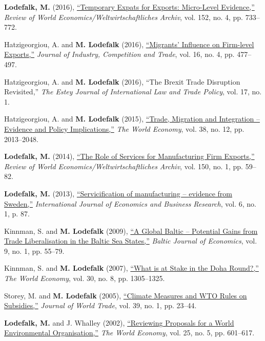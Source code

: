 \documentclass[11pt,a4paper]{article}
\newcommand{\name}[1]{\textbf{#1}}
\newcommand{\publication}[1]{\item #1}
\begin{document}
\begin{enumerate}[label={[\arabic*]}]
\publication{\name{Lodefalk, M.} (2016), \href{https://doi.org/10.1007/s10290-016-0254-0}{``Temporary Expats for Exports: Micro-Level Evidence,''} \textit{Review of World Economics/Weltwirtschaftliches Archiv}, vol. 152, no. 4, pp. 733--772.}

\publication{Hatzigeorgiou, A. and \name{M. Lodefalk} (2016), \href{https://doi.org/10.1007/s10842-015-0215-7}{``Migrants' Influence on Firm-level Exports,''} \textit{Journal of Industry, Competition and Trade}, vol. 16, no. 4, pp. 477--497.}

\publication{Hatzigeorgiou, A. and \name{M. Lodefalk} (2016), ``The Brexit Trade Disruption Revisited,'' \textit{The Estey Journal of International Law and Trade Policy}, vol. 17, no. 1.}

\publication{Hatzigeorgiou, A. and \name{M. Lodefalk} (2015), \href{https://doi.org/10.1111/twec.12236}{``Trade, Migration and Integration -- Evidence and Policy Implications,''} \textit{The World Economy}, vol. 38, no. 12, pp. 2013--2048.}

\publication{\name{Lodefalk, M.} (2014), \href{https://doi.org/10.1007/s10290-013-0171-4}{``The Role of Services for Manufacturing Firm Exports,''} \textit{Review of World Economics/Weltwirtschaftliches Archiv}, vol. 150, no. 1, pp. 59--82.}

\publication{\name{Lodefalk, M.} (2013), \href{https://doi.org/10.1504/ijebr.2013.054855}{``Servicification of manufacturing -- evidence from Sweden,''} \textit{International Journal of Economics and Business Research}, vol. 6, no. 1, p. 87.}

\publication{Kinnman, S. and \name{M. Lodefalk} (2009), \href{https://doi.org/10.1080/1406099x.2009.10840453}{``A Global Baltic -- Potential Gains from Trade Liberalisation in the Baltic Sea States,''} \textit{Baltic Journal of Economics}, vol. 9, no. 1, pp. 55--79.}

\publication{Kinnman, S. and \name{M. Lodefalk} (2007), \href{https://doi.org/10.1111/j.1467-9701.2007.01045.x}{``What is at Stake in the Doha Round?,''} \textit{The World Economy}, vol. 30, no. 8, pp. 1305--1325.}

\publication{Storey, M. and \name{M. Lodefalk} (2005), \href{https://doi.org/10.54648/trad2005005}{``Climate Measures and WTO Rules on Subsidies,''} \textit{Journal of World Trade}, vol. 39, no. 1, pp. 23--44.}

\publication{\name{Lodefalk, M.} and J. Whalley (2002), \href{https://doi.org/10.1111/1467-9701.00452}{``Reviewing Proposals for a World Environmental Organisation,''} \textit{The World Economy}, vol. 25, no. 5, pp. 601--617.}

\end{enumerate}
\end{document}
